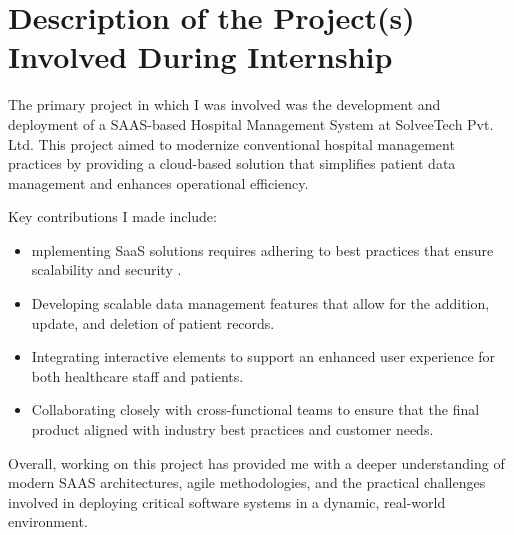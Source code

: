 \section{Description of the Project(s) Involved During Internship}
The primary project in which I was involved was the development and deployment of a SAAS-based Hospital Management System at SolveeTech Pvt. Ltd. This project aimed to modernize conventional hospital management practices by providing a cloud-based solution that simplifies patient data management and enhances operational efficiency. 

Key contributions I made include:
\begin{itemize}
  \item mplementing SaaS solutions requires adhering to best practices that ensure scalability and security \cite{miller2019survey, techdeployment2021}.
  \item Developing scalable data management features that allow for the addition, update, and deletion of patient records.
  \item Integrating interactive elements to support an enhanced user experience for both healthcare staff and patients.
  \item Collaborating closely with cross-functional teams to ensure that the final product aligned with industry best practices and customer needs.
\end{itemize}

Overall, working on this project has provided me with a deeper understanding of modern SAAS architectures, agile methodologies, and the practical challenges involved in deploying critical software systems in a dynamic, real-world environment.
